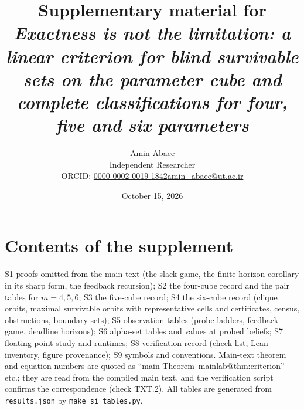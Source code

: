 \documentclass[11pt,a4paper]{article}
\makeatletter
\theoremstyle{plain}
\theoremstyle{definition}
\theoremstyle{remark}
\newcommand{\mref}[1]{\csname mainlab@#1\endcsname}
\makeatother
\begin{document}
\title{\textbf{Supplementary material for}\\ \emph{Exactness is not the limitation: a linear criterion for blind survivable sets on the parameter cube and complete classifications for four, five and six parameters}}
\author{Amin Abaee\\[0.3em]{\small Independent Researcher}\\[0.2em]{\small ORCID: \href{https://orcid.org/0000-0002-0019-1842}{0000-0002-0019-1842}\quad \href{mailto:amin_abaee@ut.ac.ir}{amin\_abaee@ut.ac.ir}}}
\date{October 15, 2026}
\maketitle

\section*{Contents of the supplement}
S1 proofs omitted from the main text (the slack game, the finite-horizon corollary in its sharp form, the feedback recursion); S2 the four-cube record and the pair tables for $m=4,5,6$; S3 the five-cube record; S4 the six-cube record (clique orbits, maximal survivable orbits with representative cells and certificates, census, obstructions, boundary sets); S5 observation tables (probe ladders, feedback game, deadline horizons); S6 alpha-set tables and values at probed beliefs; S7 floating-point study and runtimes; S8 verification record (check list, Lean inventory, figure provenance); S9 symbols and conventions. Main-text theorem and equation numbers are quoted as ``main Theorem~\mref{thm:criterion}'' etc.; they are read from the compiled main text, and the verification script confirms the correspondence (check TXT.2). All tables are generated from \texttt{results.json} by \texttt{make\_si\_tables.py}.
\end{document}
